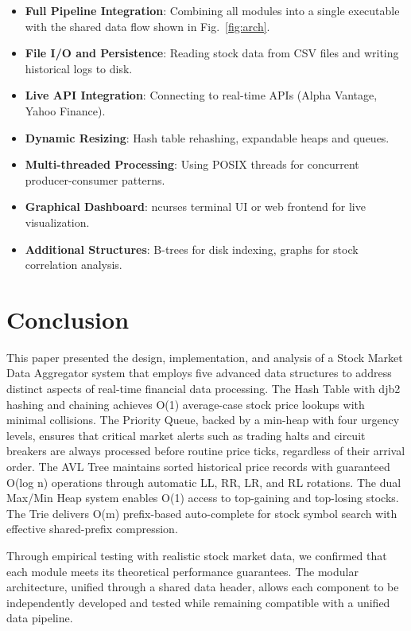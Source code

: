 \documentclass[conference]{IEEEtran}
\begin{document}
\begin{itemize}
\item \textbf{Full Pipeline Integration}: Combining all modules into a single executable with the shared data flow shown in Fig.~\ref{fig:arch}.
\item \textbf{File I/O and Persistence}: Reading stock data from CSV files and writing historical logs to disk.
\item \textbf{Live API Integration}: Connecting to real-time APIs (Alpha Vantage, Yahoo Finance).
\item \textbf{Dynamic Resizing}: Hash table rehashing, expandable heaps and queues.
\item \textbf{Multi-threaded Processing}: Using POSIX threads for concurrent producer-consumer patterns.
\item \textbf{Graphical Dashboard}: ncurses terminal UI or web frontend for live visualization.
\item \textbf{Additional Structures}: B-trees for disk indexing, graphs for stock correlation analysis.
\end{itemize}

\section{Conclusion}

This paper presented the design, implementation, and analysis of a Stock Market Data Aggregator system that employs five advanced data structures to address distinct aspects of real-time financial data processing. The Hash Table with djb2 hashing and chaining achieves O(1) average-case stock price lookups with minimal collisions. The Priority Queue, backed by a min-heap with four urgency levels, ensures that critical market alerts such as trading halts and circuit breakers are always processed before routine price ticks, regardless of their arrival order. The AVL Tree maintains sorted historical price records with guaranteed O(log n) operations through automatic LL, RR, LR, and RL rotations. The dual Max/Min Heap system enables O(1) access to top-gaining and top-losing stocks. The Trie delivers O(m) prefix-based auto-complete for stock symbol search with effective shared-prefix compression.

Through empirical testing with realistic stock market data, we confirmed that each module meets its theoretical performance guarantees. The modular architecture, unified through a shared data header, allows each component to be independently developed and tested while remaining compatible with a unified data pipeline.
\end{document}
